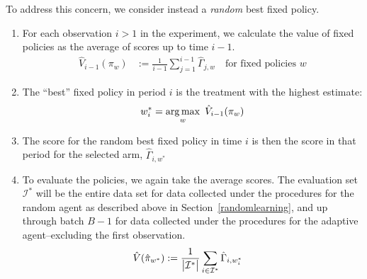 \documentclass[letterpaper, 12pt, parskip=full,]{scrartcl}
\begin{document}
To address this concern, we consider instead a \textit{random} best fixed policy. 
\begin{enumerate}
\item For each observation $i>1$ in the experiment, we calculate the value of fixed policies as the average of scores up to time $i-1$. 
\begin{align*}
\hat{V}_{i-1}({\pi}_{w})  &:= \frac{1}{i-1 } \sum_{j = 1 }^{i-1} \hat{\Gamma}_{j,w} \quad \text{for fixed policies $w$}
\end{align*}
\item The ``best'' fixed policy in period $i$ is the treatment with the highest estimate:
\begin{align*}
w_i^* =  \operatorname*{arg\,max}_w \ \hat{V}_{i-1}({\pi}_{w})
\end{align*}
\item The score for the random best fixed policy in time $i$ is then the score in that period for the selected arm, $\hat{\Gamma}_{i, w^*}$ 
 \item To evaluate the policies, we again take the average scores. The evaluation set $\mathcal{I}^*$ will be the entire data set for data collected under the procedures for the random agent as described above in Section~\ref{randomlearning}, and up through batch $B-1$ for data collected under the procedures for the adaptive agent--excluding the first observation. 
    \begin{align*}
          \hat{V}(\hat{\pi}_{w^*})  &:= \frac{1}{\big{\lvert} \mathcal{I}^* \big{\rvert}} \sum_{i \in \mathcal{I}^* } 
          \hat{\Gamma}_{i, w_i^*} 
  \end{align*}
\end{enumerate}
\end{document}
